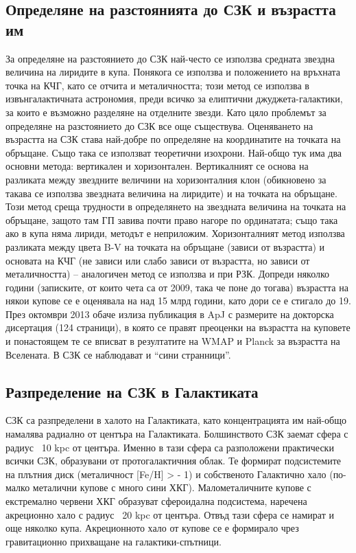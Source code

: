 \documentclass[a4paper,12pt]{article}
\begin{document}
\subsection{Определяне на разстоянията до СЗК и възрастта им}
За определяне на разстоянието до СЗК най-често се използва средната звездна величина на лиридите в купа. Понякога се използва и положението на връхната точка на КЧГ, като се отчита и металичността; този метод се използва в извънгалактичната астрономия, преди всичко за елиптични джуджета-галактики, за които е възможно разделяне на отделните
звезди. Като цяло проблемът за определяне на разстоянието до СЗК все още съществува. Оценяването на възрастта на СЗК става най-добре по определяне на координатите на точката на обръщане. Също така се използват теоретични изохрони. Най-общо тук има два основни метода: вертикален и хоризонтален. Вертикалният се основа на разликата между звездните величини на хоризонталния клон (обикновено за такава се използва звездната величина на лиридите) и на точката на обръщане. Този метод среща трудности в определянето на звездната величина на точката на обръщане, защото там ГП завива почти право нагоре по
ординатата; също така ако в купа няма лириди, методът е неприложим. Хоризонталният метод използва разликата между цвета B-V на точката на обръщане (зависи от възрастта) и основата на КЧГ (не зависи или слабо зависи от възрастта, но зависи от металичността) – аналогичен метод се използва и при РЗК. Допреди няколко години (записките, от които чета са от 2009, така че поне до тогава) възрастта на някои купове се е оценявала на над 15 млрд години, като дори се е стигало до 19. През октомври 2013 обаче излиза публикация в ApJ с размерите на докторска дисертация (124 страници), в която се правят преоценки на възрастта на куповете и понастоящем те се вписват в резултатите на WMAP и Planck за възрастта на Вселената.
В СЗК се наблюдават и “сини странници”.\\

\subsection{Разпределение на СЗК в Галактиката}
СЗК са разпределени в халото на Галактиката, като концентрацията им най-общо намалява радиално от центъра на Галактиката. Болшинството СЗК заемат сфера с радиус ~10 kpc от центъра. Именно в тази сфера са разположени практически всички СЗК, образувани от протогалактичния облак. Те формират подсистемите на плътния диск (металичност [Fe/H] > - 1) и собственото Галактично хало (по-малко металични купове с много сини ХКГ). Малометаличните купове с екстремално червени ХКГ образуват сфероидална подсистема, наречена акреционно хало с радиус ~20 kpc от центъра. Отвъд тази сфера се намират и още
няколко купа. Акреционното хало от купове се е формирало чрез гравитационно прихващане на галактики-спътници.\\
\end{document}
